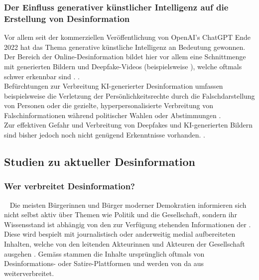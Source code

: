 \documentclass[12pt,a4paper]{article}        %
\begin{document}
\subsubsection{Der Einfluss generativer künstlicher Intelligenz auf die Erstellung von Desinformation}
Vor allem seit der kommerziellen Veröffentlichung von OpenAI’s ChatGPT Ende 2022 hat das Thema generative künstliche Intelligenz an Bedeutung gewonnen. Der Bereich der Online-Desinformation bildet hier vor allem eine Schnittmenge mit generierten Bildern und Deepfake-Videos (beispielsweise  \parencite[5]{birrer_what_2024}), welche oftmals schwer erkennbar sind \parencites[7]{montasari_artificial_2022}.  \parencite[4]{bontridder_role_2021}. \\
Befürchtungen zur Verbreitung KI-generierter Desinformation umfassen beispielsweise die Verletzung der Persönlichkeitsrechte durch die Falschdarstellung von Personen oder die gezielte, hyperpersonalisierte Verbreitung von Falschinformationen während politischer Wahlen oder Abstimmungen \parencite[56, 64f]{kertysova_artificial_2018}.\\ 
Zur effektiven Gefahr und Verbreitung von Deepfakes und KI-generierten Bildern sind bisher jedoch noch nicht genügend Erkenntnisse vorhanden. \parencite{birrer_what_2024}.

\subsection{Studien zu aktueller Desinformation}
\subsubsection{Wer verbreitet Desinformation?}
~\label{theory_disseminents}
Die meisten Bürgerinnen und Bürger moderner Demokratien informieren sich nicht selbst aktiv über Themen wie Politik und die Gesellschaft, sondern ihr Wissensstand ist abhängig von den zur Verfügung stehenden Informationen der . Diese wird bespielt mit journalistisch oder anderweitig medial aufbereiteten Inhalten, welche von den leitenden Akteurinnen und Akteuren der Gesellschaft ausgehen \parencite[69]{lecheler_disinformation_2022}. Gemäss \textcite[217]{allcott_social_2017} stammen die Inhalte ursprünglich oftmals von Desinformations- oder Satire-Plattformen und werden von da aus weiterverbreitet. 
\end{document}
